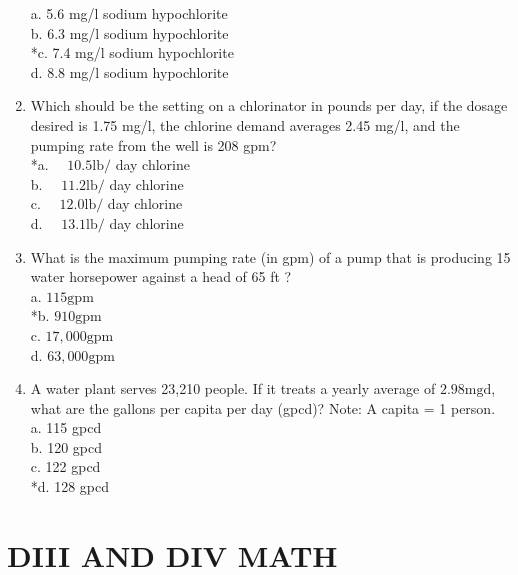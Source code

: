 \begin{enumerate}
a. 5.6 mg/l sodium hypochlorite\\
b. 6.3 mg/l sodium hypochlorite\\
*c. 7.4 mg/l sodium hypochlorite\\
d. 8.8 mg/l sodium hypochlorite\\
  \item Which should be the setting on a chlorinator in pounds per day, if the dosage desired is 1.75 mg/l, the chlorine demand averages 2.45 mg/l, and the pumping rate from the well is 208 gpm?\\
*a. $\quad 10.5 \mathrm{lb} /$ day chlorine\\
b. $\quad 11.2 \mathrm{lb} /$ day chlorine\\
c. $\quad 12.0 \mathrm{lb} /$ day chlorine\\
d. $\quad 13.1 \mathrm{lb} /$ day chlorine\\
  \item What is the maximum pumping rate (in gpm) of a pump that is producing 15 water horsepower against a head of 65 ft ?\\
a. $115 \mathrm{gpm}$\\
*b. $910 \mathrm{gpm}$\\
c. $17,000 \mathrm{gpm}$\\
d. $63,000 \mathrm{gpm}$\\
  \item A water plant serves 23,210 people. If it treats a yearly average of $2.98 \mathrm{mgd}$, what are the gallons per capita per day (gpcd)? Note: A capita = 1 person.\\
a. 115 gpcd\\
b. 120 gpcd\\
c. 122 gpcd\\
*d. 128 gpcd\\
\end{enumerate}


\section{DIII AND DIV MATH}

